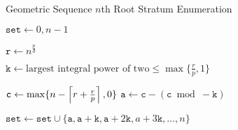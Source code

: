 \begin{algorithm}
\caption{Geometric Sequence $n$th Root Stratum Enumeration}
\label{alg:geom-seq-nth-root-enum-retained-ranks}
\begin{algorithmic}
\end{algorithmic}

\begin{algorithmic}[1]
    \State $\texttt{set} \gets {0, n - 1}$

        \State $\texttt{r} \gets n^{\frac{p}{d}}$

        \State $\texttt{k} \gets \text{largest integral power of two} \le \max \{\frac{r}{p}, 1 \}$ %

        \State $\texttt{c} \gets \max \{n - \left\lceil r + \frac{r}{p} \right\rceil, 0\}$
        \State $\texttt{a} \gets \texttt{c} - (\texttt{c} \bmod -\texttt{k})$

        \State $\texttt{set} \gets \texttt{set} \cup \{\texttt{a}, \texttt{a} + \texttt{k}, \texttt{a} + 2\texttt{k}, {a} + 3\texttt{k}, \dots, n\}$
    \EndFor
\end{algorithmic}
\end{algorithm}
